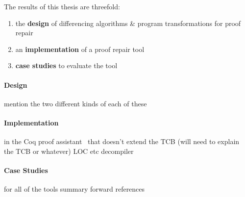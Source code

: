 The results of this thesis are threefold:

\begin{enumerate}
\item the \textbf{design} of differencing algorithms \& program transformations for proof repair
\item an \textbf{implementation} of a proof repair tool 
\item \textbf{case studies} to evaluate the tool
\end{enumerate}

\paragraph{Design}
mention the two different kinds of each of these

\paragraph{Implementation}
\sysname
in the Coq proof assistant~\cite{coq} that doesn't extend the TCB (will need to explain the TCB or whatever)
LOC etc
decompiler

\paragraph{Case Studies}
for all of the tools
summary
forward references



